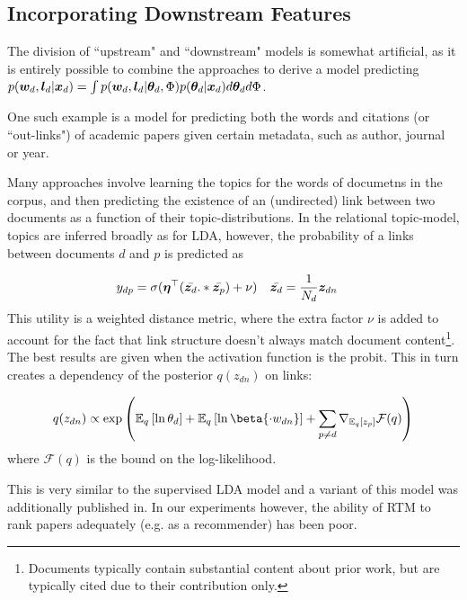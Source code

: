 

\newcommand \ld { \vv{l}_d }
\newcommand \thod {{ \vv{\theta}_{\cdot d} }}
\newcommand \thko {{ \vv{\theta}_{k \cdot} }}

\subsection{Incorporating Downstream Features}
The division of ``upstream" and ``downstream" models is somewhat artificial, as it is entirely possible to combine the approaches to derive a model predicting $p(\wdoc, \ld | \xd) = \int p(\wdoc, \ld|\thd,\Phi) p(\thd | \xd) d\thd d\Phi$.

One such example is a model for predicting both the words and citations (or ``out-links") of academic papers given certain metadata, such as author, journal or year.

Many approaches involve learning the topics for the words of documetns in the corpus, and then predicting the existence of an (undirected) link between two documents as a function of their topic-distributions. In the relational topic-model\cite{Chang2009a}\cite{Chang2010a}, topics are inferred broadly as for LDA, however, the probability of a links between documents $d$ and $p$ is predicted as

\begin{align*}
y_{dp} & = \sigma(\bm \eta^\top (\bar{\bm z_d} .* \bar{\bm z_p}) + \nu) &
\bar{\bm z_d} & = \frac{1}{N_d} \bm z_{dn}
\end{align*}
This utility is a weighted distance metric, where the extra factor $\nu$ is added to account for the fact that link structure doesn't always match document content\footnote{Documents typically contain substantial content about prior work, but are typically cited due to their contribution only.}. The best results are given when the activation function is the probit. This in turn creates a dependency of the posterior $q(z_{dn})$ on links:

\begin{align*}
q(z_{dn}) \propto \exp\left(
\mathbb{E}_q\left[ \ln \theta_d \right]
+ \mathbb{E}_q\left[ \ln \beta{\cdot w_{dn}} \right]
+ \sum_{p \neq d} \nabla_{\ex{z_p}{q}} \mathcal{F}(q)
\right)
\end{align*}
where $\mathcal{F}(q)$ is the bound on the log-likelihood.

This is very similar to the supervised LDA model \cite{Blei2008} and a variant of this model was additionally published in\cite{Neiswanger2014}. In our experiments however, the ability of RTM to rank papers adequately (e.g. as a recommender) has been poor.


